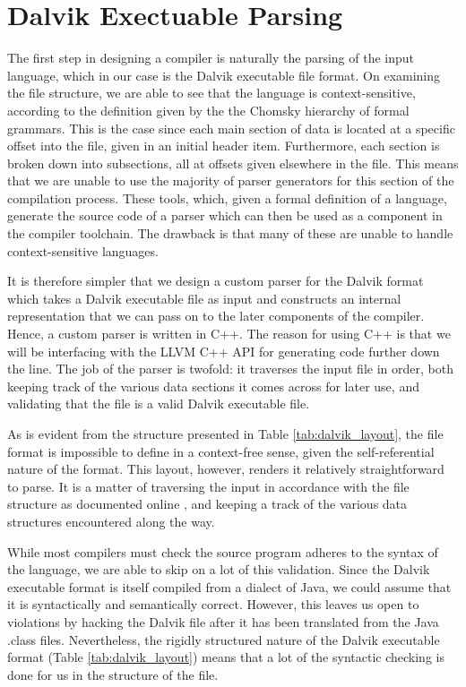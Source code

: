 \section{Dalvik Exectuable Parsing}
\label{sec:parsing}

The first step in designing a compiler is naturally the parsing of the input language, which in our case is the Dalvik executable file format. On examining the file structure, we are able to see that the language is context-sensitive, according to the definition given by the the Chomsky hierarchy of formal grammars. This is the case since each main section of data is located at a specific offset into the file, given in an initial header item. Furthermore, each section is broken down into subsections, all at offsets given elsewhere in the file. This means that we are unable to use the majority of parser generators for this section of the compilation process. These tools, which, given a formal definition of a language, generate the source code of a parser which can then be used as a component in the compiler toolchain. The drawback is that many of these are unable to handle context-sensitive languages.


It is therefore simpler that we design a custom parser for the Dalvik format which takes a Dalvik executable file as input and constructs an internal representation that we can pass on to the later components of the compiler. Hence, a custom parser is written in C++. The reason for using C++ is that we will be interfacing with the LLVM C++ API for generating code further down the line. The job of the parser is twofold: it traverses the input file in order, both keeping track of the various data sections it comes across for later use, and validating that the file is a valid Dalvik executable file.

As is evident from the structure presented in Table \ref{tab:dalvik_layout}, the file format is impossible to define in a context-free sense, given the self-referential nature of the format. This layout, however, renders it relatively straightforward to parse. It is a matter of traversing the input in accordance with the file structure as documented online \cite{dvk_format}, and keeping a track of the various data structures encountered along the way.

While most compilers must check the source program adheres to the syntax of the language, we are able to skip on a lot of this validation. Since the Dalvik executable format is itself compiled from a dialect of Java, we could assume that it is syntactically and semantically correct. However, this leaves us open to violations by hacking the Dalvik file after it has been translated from the Java .class files. Nevertheless, the rigidly structured nature of the Dalvik executable format (Table \ref{tab:dalvik_layout}) means that a lot of the syntactic checking is done for us in the structure of the file.

